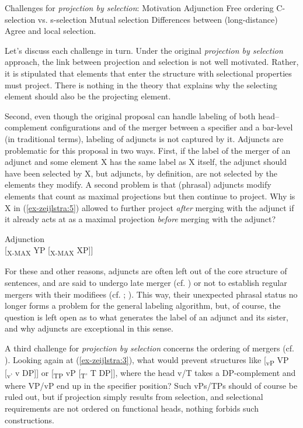 \documentclass[output=paper
,modfonts
,nonflat]{langsci/langscibook}
\begin{document}
\begin{exe}
\ex Challenges for \textit{projection by selection}:
	\xlist
	\ex Motivation
	\ex Adjunction
	\ex Free ordering
	\ex C-selection vs. s-selection
	\ex Mutual selection
	\ex Differences between (long-distance) Agree and local selection.
	\endxlist
\end{exe}
Let’s discuss each challenge in turn. Under the original \textit{projection by selection} approach, the link between projection and selection is not well motivated. Rather, it is stipulated that elements that enter the structure with selectional properties must project. There is nothing in the theory that explains why the selecting element should also be the projecting element.  

Second, even though the original proposal can handle labeling of both head–complement configurations and of the merger between a specifier and a bar-level (in traditional terms), labeling of adjuncts is not captured by it. Adjuncts are problematic for this proposal in two ways. First, if the label of the merger of an adjunct and some element X has the same label as X itself, the adjunct should have been selected by X, but adjuncts, by definition, are not selected by the elements they modify. A second problem is that (phrasal) adjuncts modify elements that count as maximal projections but then continue to project. Why is X in (\ref{ex-zeijlstra:5}) allowed to further project \textit{after} merging with the adjunct if it already acts at as a maximal projection \textit{before} merging with the adjunct?  

\begin{exe}
\ex Adjunction \label{ex-zeijlstra:5} \\
	{[}\textsubscript{X-MAX} YP {[}\textsubscript{X-MAX} XP{]}{]}
\end{exe}
For these and other reasons, adjuncts are often left out of the core structure of sentences, and are said to undergo late merger (cf. \citealt{Lebeaux1988}) or not to establish regular mergers with their modifiees (cf. \citealt{Chomsky2001}; \citealt{Hornstein_Nunes2009}). This way, their unexpected phrasal status no longer forms a problem for the general labeling algorithm, but, of course, the question is left open as to what generates the label of an adjunct and its sister, and why adjuncts are exceptional in this sense.

A third challenge for \textit{projection by selection} concerns the ordering of mergers (cf. \citealt{Adger2013}). Looking again at (\ref{ex-zeijlstra:3}), what would prevent structures like {[}\textsubscript{vP} VP {[}\textsubscript{v'} v DP{]}{]} or {[}\textsubscript{TP} vP {[}\textsubscript{T'} T DP{]}{]}, where the head v/T takes a DP-complement and where VP/vP end up in the specifier position? Such vPs/TPs should of course be ruled out, but if projection simply results from selection, and selectional requirements are not ordered on functional heads, nothing forbids such constructions.
\end{document}
